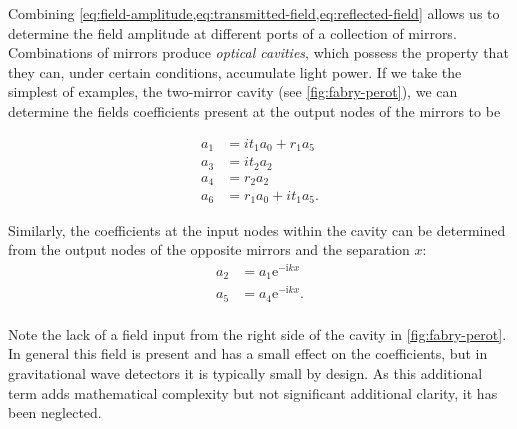 Combining \cref{eq:field-amplitude,eq:transmitted-field,eq:reflected-field} allows us to determine the field amplitude at different ports of a collection of mirrors. Combinations of mirrors produce \emph{optical cavities}, which possess the property that they can, under certain conditions, accumulate light power. If we take the simplest of examples, the two-mirror \FP{} cavity (see \cref{fig:fabry-perot}), we can determine the fields coefficients present at the output nodes of the mirrors to be

\begin{equation}
  \label{eq:fabry-perot-coefficients-1}
  \begin{split}
    a_1 &= it_1 a_0 + r_1 a_5 \\
    a_3 &= it_2 a_2 \\
    a_4 &= r_2 a_2 \\
    a_6 &= r_1 a_0 + it_1 a_5.
  \end{split}
\end{equation}

Similarly, the coefficients at the input nodes within the cavity can be determined from the output nodes of the opposite mirrors and the separation $x$:
\begin{equation}
  \label{eq:fabry-perot-coefficients-2}
  \begin{split}
    a_2 &= a_1 \text{e}^{-\text{i} kx} \\
    a_5 &= a_4 \text{e}^{-\text{i} kx}. \\
  \end{split}
\end{equation}

Note the lack of a field input from the right side of the cavity in \cref{fig:fabry-perot}. In general this field is present and has a small effect on the coefficients, but in gravitational wave detectors it is typically small by design. As this additional term adds mathematical complexity but not significant additional clarity, it has been neglected.

